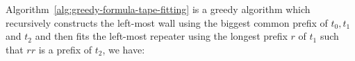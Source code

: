 Algorithm~\ref{alg:greedy-formula-tape-fitting} is a greedy algorithm which recursively constructs the left-most wall using the biggest common prefix of $t_0, t_1$ and $t_2$ and then fits the left-most repeater using the longest prefix $r$ of $t_1$ such that $rr$ is a prefix of $t_2$, we have:





